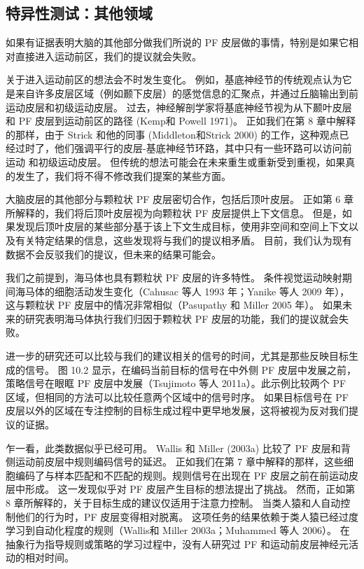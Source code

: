 \subsection{特异性测试：其他领域}
如果有证据表明大脑的其他部分做我们所说的 PF 皮层做的事情，特别是如果它相对直接进入运动前区，我们的提议就会失败。
\par 
关于进入运动前区的想法会不时发生变化。 例如，基底神经节的传统观点认为它是来自许多皮层区域（例如颞下皮层）的感觉信息的汇聚点，并通过丘脑输出到前运动皮层和初级运动皮层。 过去，神经解剖学家将基底神经节视为从下颞叶皮层和 PF 皮层到运动前区的路径 (Kemp和 Powell 1971)。 正如我们在第 8 章中解释的那样，由于 Strick 和他的同事 (Middleton和Strick 2000) 的工作，这种观点已经过时了，他们强调平行的皮层-基底神经节环路，其中只有一些环路可以访问前运动 和初级运动皮层。 但传统的想法可能会在未来重生或重新受到重视，如果真的发生了，我们将不得不修改我们提案的某些方面。
\par 
大脑皮层的其他部分与颗粒状 PF 皮层密切合作，包括后顶叶皮层。 正如第 6 章所解释的，我们将后顶叶皮层视为向颗粒状 PF 皮层提供上下文信息。 但是，如果发现后顶叶皮层的某些部分基于该上下文生成目标，使用非空间和空间上下文以及有关特定结果的信息，这些发现将与我们的提议相矛盾。 目前，我们认为现有数据不会反驳我们的提议，但未来的结果可能会。
\par 
我们之前提到，海马体也具有颗粒状 PF 皮层的许多特性。 条件视觉运动映射期间海马体的细胞活动发生变化（Cahusac 等人 1993 年；Yanike 等人 2009 年），这与颗粒状 PF 皮层中的情况非常相似（Pasupathy 和 Miller 2005 年）。 如果未来的研究表明海马体执行我们归因于颗粒状 PF 皮层的功能，我们的提议就会失败。
\par 
进一步的研究还可以比较与我们的建议相关的信号的时间，尤其是那些反映目标生成的信号。 图 10.2 显示，在编码当前目标的信号在中外侧 PF 皮层中发展之前，策略信号在眼眶 PF 皮层中发展（Tsujimoto 等人 2011a）。此示例比较两个 PF 区域，但相同的方法可以比较任意两个区域中的信号时序。 如果目标信号在 PF 皮层以外的区域在专注控制的目标生成过程中更早地发展，这将被视为反对我们提议的证据。
\par 
乍一看，此类数据似乎已经可用。 Wallis 和 Miller (2003a) 比较了 PF 皮层和背侧运动前皮层中规则编码信号的延迟。 正如我们在第 7 章中解释的那样，这些细胞编码了与样本匹配和不匹配的规则。规则信号在出现在 PF 皮层之前在前运动皮层中形成。 这一发现似乎对 PF 皮层产生目标的想法提出了挑战。 然而，正如第 8 章所解释的，关于目标生成的建议仅适用于注意力控制。 当类人猿和人自动控制他们的行为时，PF 皮层变得相对脱离。 这项任务的结果依赖于类人猿已经过度学习到自动化程度的规则（Wallis和 Miller 2003a；Muhammed 等人 2006）。 在抽象行为指导规则或策略的学习过程中，没有人研究过 PF 和运动前皮层神经元活动的相对时间。
